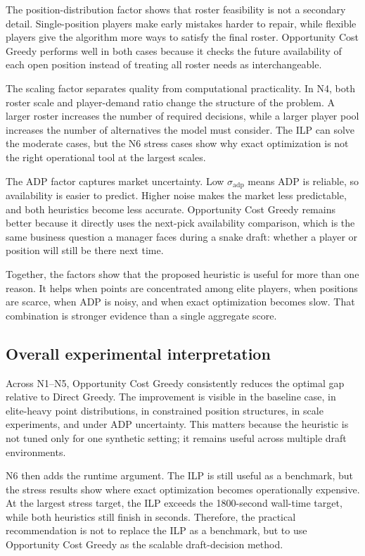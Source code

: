 \documentclass[10pt,a4paper]{article}
\begin{document}
The position-distribution factor shows that roster feasibility is not a secondary detail. Single-position players make early mistakes harder to repair, while flexible players give the algorithm more ways to satisfy the final roster. Opportunity Cost Greedy performs well in both cases because it checks the future availability of each open position instead of treating all roster needs as interchangeable.

The scaling factor separates quality from computational practicality. In N4, both roster scale and player-demand ratio change the structure of the problem. A larger roster increases the number of required decisions, while a larger player pool increases the number of alternatives the model must consider. The ILP can solve the moderate cases, but the N6 stress cases show why exact optimization is not the right operational tool at the largest scales.

The ADP factor captures market uncertainty. Low $\sigma_{\text{adp}}$ means ADP is reliable, so availability is easier to predict. Higher noise makes the market less predictable, and both heuristics become less accurate. Opportunity Cost Greedy remains better because it directly uses the next-pick availability comparison, which is the same business question a manager faces during a snake draft: whether a player or position will still be there next time.

Together, the factors show that the proposed heuristic is useful for more than one reason. It helps when points are concentrated among elite players, when positions are scarce, when ADP is noisy, and when exact optimization becomes slow. That combination is stronger evidence than a single aggregate score.

\subsection{Overall experimental interpretation}

Across N1--N5, Opportunity Cost Greedy consistently reduces the optimal gap relative to Direct Greedy. The improvement is visible in the baseline case, in elite-heavy point distributions, in constrained position structures, in scale experiments, and under ADP uncertainty. This matters because the heuristic is not tuned only for one synthetic setting; it remains useful across multiple draft environments.

N6 then adds the runtime argument. The ILP is still useful as a benchmark, but the stress results show where exact optimization becomes operationally expensive. At the largest stress target, the ILP exceeds the 1800-second wall-time target, while both heuristics still finish in seconds. Therefore, the practical recommendation is not to replace the ILP as a benchmark, but to use Opportunity Cost Greedy as the scalable draft-decision method.
\end{document}
